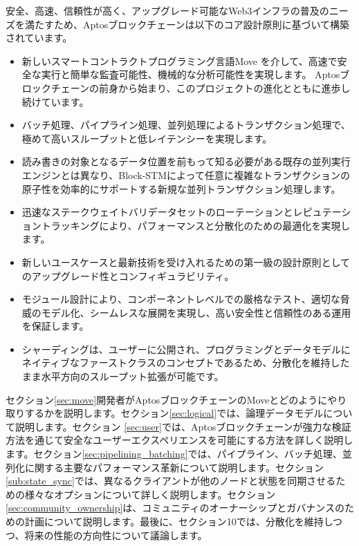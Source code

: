 \documentclass{article}
\begin{document}
安全、高速、信頼性が高く、アップグレード可能なWeb3インフラの普及のニーズを満たすため、Aptosブロックチェーンは以下のコア設計原則に基づいて構築されています。

\begin{itemize}
 \item 新しいスマートコントラクトプログラミング言語Move \cite{move}を介して、高速で安全な実行と簡単な監査可能性、機械的な分析可能性を実現します。 Aptosブロックチェーンの前身から始まり、このプロジェクトの進化とともに進歩し続けています。
 
 \item バッチ処理、パイプライン処理、並列処理によるトランザクション処理で、極めて高いスループットと低レイテンシーを実現します。
 
 \item 読み書きの対象となるデータ位置を前もって知る必要がある既存の並列実行エンジンとは異なり、Block-STMによって任意に複雑なトランザクションの原子性を効率的にサポートする新規な並列トランザクション処理します。
 
 \item 迅速なステークウェイトバリデータセットのローテーションとレピュテーショントラッキングにより、パフォーマンスと分散化のための最適化を実現します。
 
 \item 新しいユースケースと最新技術を受け入れるための第一級の設計原則としてのアップグレード性とコンフィギュラビリティ。
 
 \item モジュール設計により、コンポーネントレベルでの厳格なテスト、適切な脅威のモデル化、シームレスな展開を実現し、高い安全性と信頼性のある運用を保証します。
 
 \item シャーディングは、ユーザーに公開され、プログラミングとデータモデルにネイティブなファーストクラスのコンセプトであるため、分散化を維持したまま水平方向のスループット拡張が可能です。
 
\end{itemize}
セクション\ref{sec:move}開発者がAptosブロックチェーンのMoveとどのようにやり取りするかを説明します。セクション\ref{sec:logical}では、論理データモデルについて説明します。セクション \ref{sec:user}では、Aptosブロックチェーンが強力な検証方法を通じて安全なユーザーエクスペリエンスを可能にする方法を詳しく説明します。セクション\ref{sec:pipelining_batching}では、パイプライン、バッチ処理、並列化に関する主要なパフォーマンス革新について説明します。セクション\ref{sub:state_sync}では、異なるクライアントが他のノードと状態を同期させるための様々なオプションについて詳しく説明します。セクション\ref{sec:community_ownership}は、コミュニティのオーナーシップとガバナンスのための計画について説明します。最後に、セクション10では、分散化を維持しつつ、将来の性能の方向性について議論します。
\end{document}
